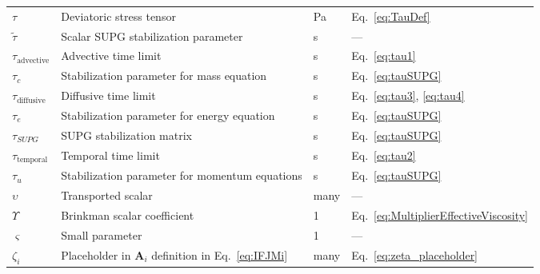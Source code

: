 \begin{longtable}{p{2cm}p{9cm}p{2cm}p{5cm}}
\(\tau\) & Deviatoric stress tensor & \si{\pascal} & Eq.\ \eqref{eq:TauDef}\\
\(\tilde{\tau}\) & Scalar SUPG stabilization parameter & \si{\second} & ---\\
\(\tau_\text{advective}\) & Advective time limit & \si{\second} & Eq.\ \eqref{eq:tau1}\\
\(\tau_c\) & Stabilization parameter for mass equation & \si{\second} & Eq.\ \eqref{eq:tauSUPG}\\
\(\tau_\text{diffusive}\) & Diffusive time limit & \si{\second} & Eq.\ \eqref{eq:tau3}, \eqref{eq:tau4}\\
\(\tau_e\) & Stabilization parameter for energy equation & \si{\second} & Eq.\ \eqref{eq:tauSUPG}\\
\(\tau_{SUPG}\) & SUPG stabilization matrix & \si{\second} & Eq.\ \eqref{eq:tauSUPG}\\
\(\tau_\text{temporal}\) & Temporal time limit & \si{\second} & Eq.\ \eqref{eq:tau2}\\
\(\tau_u\) & Stabilization parameter for momentum equations & \si{\second} & Eq.\ \eqref{eq:tauSUPG}\\
\(\upsilon\) & Transported scalar & many & ---\\
\(\Upsilon\) & Brinkman scalar coefficient & 1 & Eq.\ \eqref{eq:MultiplierEffectiveViscosity}\\
\(\varsigma\) & Small parameter & 1 & ---\\
\(\zeta_i\) & Placeholder in \(\textbf{A}_i\) definition in Eq.\ \eqref{eq:IFJMi} & many & Eq.\ \eqref{eq:zeta_placeholder}\\
\end{longtable}

